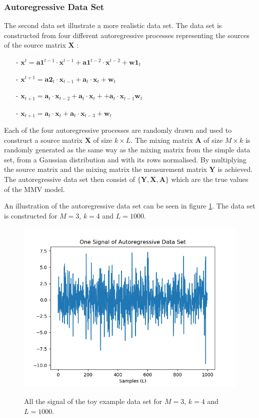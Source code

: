 \subsubsection{Autoregressive Data Set}
The second data set illustrate a more realistic data set.
The data set is constructed from four different autoregressive processes representing the sources of the source matrix $\mathbf{X}$ : 
\begin{itemize}
\item[-] $\mathbf{x}^{t} = \mathbf{a1}^{t-1} \cdot \mathbf{x}^{t-1} + \mathbf{a1}^{t-2} \cdot \mathbf{x}^{t-2} + \mathbf{w1}_t$
\item[-] $\mathbf{x}^{t+1} = \mathbf{a2}_t \cdot \mathbf{x}_{t-1} + \mathbf{a}_t \cdot \mathbf{x}_t + \mathbf{w}_t$
\item[-] $\mathbf{x}_{t+1} = \mathbf{a}_t \cdot \mathbf{x}_{t-2} + \mathbf{a}_t \cdot \mathbf{x}_t + + \mathbf{a}_t \cdot \mathbf{x}_{t-1} \mathbf{w}_t$
\item[-] $\mathbf{x}_{t+1} = \mathbf{a}_t \cdot \mathbf{x}_t + \mathbf{a}_t \cdot \mathbf{x}_{t-3} + \mathbf{w}_t$
\end{itemize}
Each of the four autoregressive processes are randomly drawn and used to construct a source matrix $\mathbf{X}$ of size $k \times L$. 
The mixing matrix $\mathbf{A}$ of size $M \times k$ is randomly generated as the same way as the mixing matrix from  the simple data set, from a Gaussian distribution and with its rows normalised. 
By multiplying the source matrix and the mixing matrix the measurement matrix $\mathbf{Y}$ is achieved.
The autoregressive data set then consist of $\{ \mathbf{Y}, \mathbf{X}, \mathbf{A} \}$ which are the true values of the MMV model.

An illustration of the autoregressive data set can be seen in figure \ref{fig:AR}. The data set is constructed for $M = 3$, $k = 4$ and $L = 1000$.
\begin{figure}[H]
\centering
\includegraphics[scale=0.5]{figures/chapter6/AR_Data_m3_n4_k4_L1000.png}
\label{fig:AR}
\caption{All the signal of the toy example data set for $M = 3$, $k=4$ and $L=1000$.}
\end{figure}
\noindent

